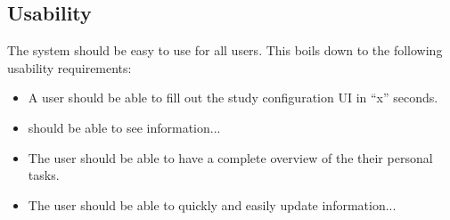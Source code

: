 





\subsection{Usability}

The system should be easy to use for all users. This boils down to the following usability requirements:

\begin{itemize}
\item A user should be able to fill out the study configuration UI in “x” seconds.
\item should be able to see information...
\item The user should be able to have a complete overview of the their personal tasks.
\item The user should be able to quickly and easily update information...
\end{itemize}



